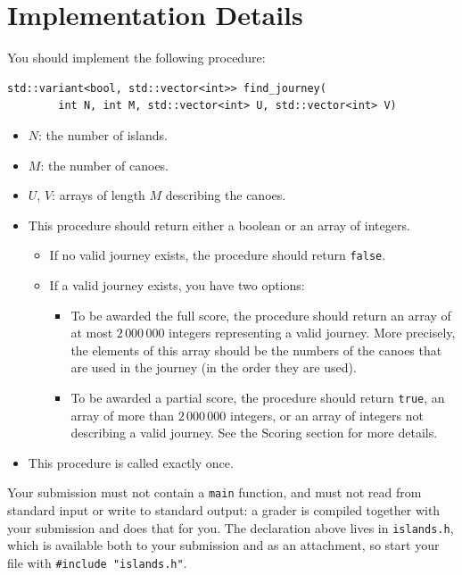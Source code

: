\section*{Implementation Details}
You should implement the following procedure:

\begin{verbatim}
std::variant<bool, std::vector<int>> find_journey(
        int N, int M, std::vector<int> U, std::vector<int> V)
\end{verbatim}

\begin{itemize}
  \item $N$: the number of islands.
  \item $M$: the number of canoes.
  \item $U$, $V$: arrays of length $M$ describing the canoes.
  \item This procedure should return either a boolean or an array of integers.
  \begin{itemize}
    \item If no valid journey exists, the procedure should return \texttt{false}.
    \item If a valid journey exists, you have two options:
    \begin{itemize}
      \item To be awarded the full score, the procedure should return an array of at most
      $2\,000\,000$ integers representing a valid journey. More precisely, the elements of this array
      should be the numbers of the canoes that are used in the journey (in the order they are used).
      \item To be awarded a partial score, the procedure should return \texttt{true}, an array of more
      than $2\,000\,000$ integers, or an array of integers not describing a valid journey. See the
      Scoring section for more details.
    \end{itemize}
  \end{itemize}
  \item This procedure is called exactly once.
\end{itemize}

Your submission must not contain a \texttt{main} function, and must not read from standard input or
write to standard output: a grader is compiled together with your submission and does that for you.
The declaration above lives in \texttt{islands.h}, which is available both to your submission and as
an attachment, so start your file with \texttt{\#include "islands.h"}.

